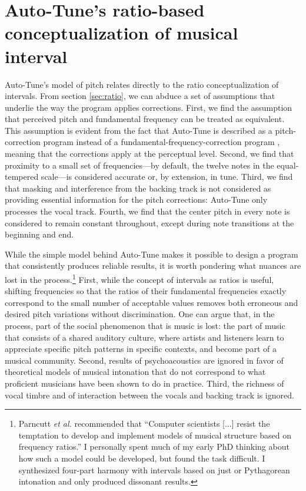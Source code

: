 \section{Auto-Tune's ratio-based conceptualization of musical interval}
\label{sec:interval-conceptualization-design}
Auto-Tune's model of pitch relates directly to the ratio conceptualization of intervals. From section \ref{sec:ratio}, we can abduce a set of assumptions that underlie the way the program applies corrections. First, we find the assumption that perceived pitch and fundamental frequency can be treated as equivalent. This assumption is evident from the fact that Auto-Tune is described as a pitch-correction program instead of a fundamental-frequency-correction program \cite{antares:2018}, meaning that the corrections apply at the perceptual level. Second, we find that proximity to a small set of frequencies---by default, the twelve notes in the equal-tempered scale---is considered accurate or, by extension, in tune. Third, we find that masking and interference from the backing track is not considered as providing essential information for the pitch corrections: Auto-Tune only processes the vocal track. Fourth, we find that the center pitch in every note is considered to remain constant throughout, except during note transitions at the beginning and end. 

While the simple model behind Auto-Tune makes it possible to design a program that consistently produces reliable results, it is worth pondering what nuances are lost in the process.\footnote{Parncutt \textit{et al.} recommended that ``Computer scientists [...] resist the temptation to develop and implement models of musical structure based on frequency ratios.'' I personally spent much of my early PhD thinking about how such a model could be developed, but found the task difficult. I synthesized four-part harmony with intervals based on just or Pythagorean intonation and only produced dissonant results.} First, while the concept of intervals as ratios is useful, shifting frequencies so that the ratios of their fundamental frequencies exactly correspond to the small number of acceptable values removes both erroneous and desired pitch variations without discrimination. One can argue that, in the process, part of the social phenomenon that is music is lost: the part of music that consists of a shared auditory culture, where artists and listeners learn to appreciate specific pitch patterns in specific contexts, and become part of a musical community. Second, results of psychoacoustics are ignored in favor of theoretical models of musical intonation that do not correspond to what proficient musicians have been shown to do in practice. Third, the richness of vocal timbre and of interaction between the vocals and backing track is ignored. 

